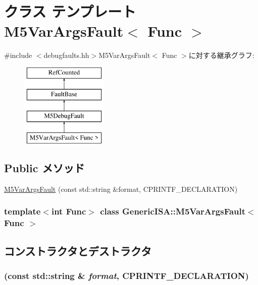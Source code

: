 \hypertarget{classGenericISA_1_1M5VarArgsFault}{
\section{クラス テンプレート M5VarArgsFault$<$ Func $>$}
\label{classGenericISA_1_1M5VarArgsFault}
}


{\ttfamily \#include $<$debugfaults.hh$>$}M5VarArgsFault$<$ Func $>$に対する継承グラフ:\begin{figure}[H]
\begin{center}
\leavevmode
\includegraphics[height=4cm]{classGenericISA_1_1M5VarArgsFault}
\end{center}
\end{figure}
\subsection*{Public メソッド}
\begin{DoxyCompactItemize}
\item 
\hyperlink{classGenericISA_1_1M5VarArgsFault_a4ca35575b33d9935873be41ee81d55ef}{M5VarArgsFault} (const std::string \&format, CPRINTF\_\-DECLARATION)
\end{DoxyCompactItemize}
\subsubsection*{template$<$int Func$>$ class GenericISA::M5VarArgsFault$<$ Func $>$}



\subsection{コンストラクタとデストラクタ}
\hypertarget{classGenericISA_1_1M5VarArgsFault_a4ca35575b33d9935873be41ee81d55ef}{
\subsubsection[{M5VarArgsFault}]{ (const std::string \& {\em format}, \/  CPRINTF\_\-DECLARATION)}}
\label{classGenericISA_1_1M5VarArgsFault_a4ca35575b33d9935873be41ee81d55ef}



